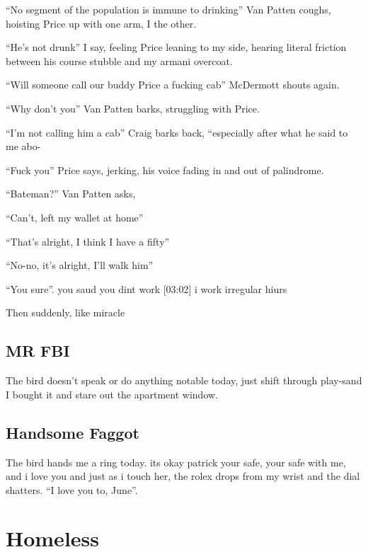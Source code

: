 \documentclass[19pt,openany]{book}
\begin{document}
``No segment of the population is immune to drinking'' Van Patten
coughs, hoisting Price up with one arm, I the other.

``He's not drunk'' I say, feeling Price leaning to my side, hearing
literal friction between his course stubble and my armani overcoat.

``Will someone call our buddy Price a fucking cab'' McDermott shouts again.

``Why don't you'' Van Patten barks, struggling with Price.

``I'm not calling him a cab'' Craig barks back, ``especially
after what he said to me abo-

``Fuck you'' Price says, jerking, his voice fading in and out
of palindrome.

``Bateman?'' Van Patten asks,

``Can't, left my wallet at home''

``That's alright, I think I have a fifty''

``No-no, it's alright, I'll walk him''

``You sure''.
you saud you dint work
[03:02]
i work irregular hiurs


Then suddenly, like miracle
\chapter{MR FBI}
The bird doesn't speak or do anything notable today,
just shift through play-sand I bought it and stare out the apartment window.

\chapter{Handsome Faggot}
The bird hands me a ring today.
its okay patrick your safe, your safe with me, and i love you
and just as i touch her, the rolex drops from my wrist and the dial shatters.
``I love you to, June''.
\part{Homeless}
\end{document}
